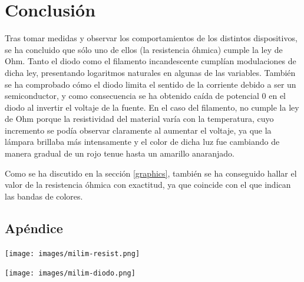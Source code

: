\documentclass[fleqn,usenatbib,openbib]{mnras}
\begin{document}
\section{Conclusión}

Tras tomar medidas y observar los comportamientos de los distintos dispositivos, se ha concluido que sólo uno de ellos (la resistencia óhmica) cumple la ley de Ohm. Tanto el diodo como el filamento incandescente cumplían modulaciones de dicha ley, presentando logaritmos naturales en algunas de las variables. También se ha comprobado cómo el diodo limita el sentido de la corriente debido a ser un semiconductor, y como consecuencia se ha obtenido caída de potencial $0$ en el diodo al invertir el voltaje de la fuente. En el caso del filamento, no cumple la ley de Ohm porque la resistividad del material varía con la temperatura, cuyo incremento se podía observar claramente al aumentar el voltaje, ya que la lámpara brillaba más intensamente y el color de dicha luz fue cambiando de manera gradual de un rojo tenue hasta un amarillo anaranjado.

Como se ha discutido en la sección \ref{graphics}, también se ha conseguido hallar el valor de la resistencia óhmica con exactitud, ya que coincide con el que indican las bandas de colores.



\vfill
\nocite{*}






\clearpage
\appendix

\begin{strip}
\section*{Apéndice}
\label{appendix}
\centering

\texttt{[image: images/milim-resist.png]}

\centering

\texttt{[image: images/milim-diodo.png]}

\end{strip}



\bsp	%
\label{lastpage}
\end{document}
